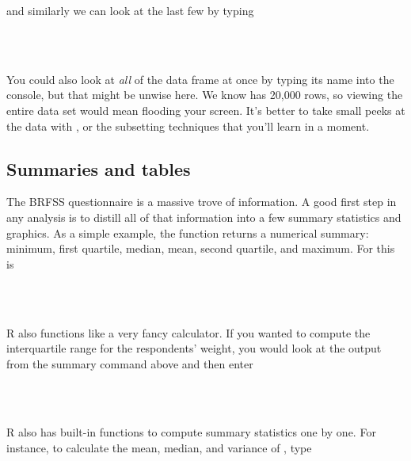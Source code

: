 \documentclass[11pt]{article}
\begin{document}
and similarly we can look at the last few by typing

\ttfamily\noindent
\hlstd{}\hspace*{\fill}\\
\hlstd{}\hlkeyword{(}\hlkeyword{)}\hspace*{\fill}\\
\normalfont

You could also look at \emph{all} of the data frame at once by typing its name into the console, but that might be unwise here.  We know \texttt{} has 20,000 rows, so viewing the entire data set would mean flooding your screen.  It's better to take small peeks at the data with \texttt{}, \texttt{} or the subsetting techniques that you'll learn in a moment.

\subsection*{Summaries and tables}
The BRFSS questionnaire is a massive trove of information.  A good first step in any analysis is to distill all of that information into a few summary statistics and graphics.  As a simple example, the function \texttt{} returns a numerical summary: minimum, first quartile, median, mean, second quartile, and maximum. For \texttt{} this is

\ttfamily\noindent
\hlstd{}\hspace*{\fill}\\
\hlstd{}\hlkeyword{(}\hlkeyword{\usebox{\hlnormalsizeboxdollar}}\hlkeyword{)}\hspace*{\fill}\\
\normalfont

R also functions like a very fancy calculator.  If you wanted to compute the interquartile range for the respondents' weight, you would look at the output from the summary command above and then enter

\ttfamily\noindent
\hlstd{}\hspace*{\fill}\\
\hlstd{}\hlkeyword{-}{\ }\hspace*{\fill}\\
\normalfont

R also has built-in functions to compute summary statistics one by one.  For instance, to calculate the mean, median, and variance of \texttt{}, type 
\end{document}
